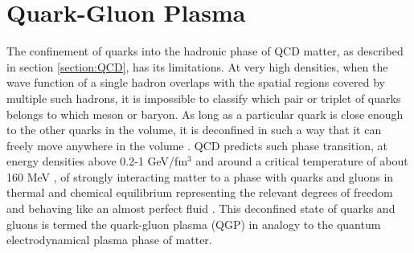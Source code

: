\section{Quark-Gluon Plasma}
The confinement of quarks into the hadronic phase of QCD matter, as described in section \ref{section:QCD}, has its limitations. At very high densities, when the wave function of a single hadron overlaps with the spatial regions covered by multiple such hadrons, it is impossible to classify which pair or triplet of quarks belongs to which meson or baryon. As long as a particular quark is close enough to the other quarks in the volume, it is deconfined in such a way that it can freely move anywhere in the volume \cite{0954-3899-32-3-R01}. QCD predicts such phase transition, at energy densities above 0.2-1 GeV/fm$^{3}$ \cite{Adam:2139456} and around a critical temperature of about 160 MeV \cite{FLORIS2014103}, of strongly interacting matter to a phase with quarks and gluons in thermal and chemical equilibrium representing the relevant degrees of freedom and behaving like an almost perfect fluid \cite{PhysRevLett.109.152303}. This deconfined state of quarks and gluons is termed the quark-gluon plasma (QGP) in analogy to the quantum electrodynamical plasma phase of matter.
